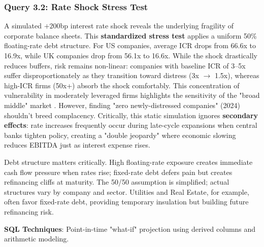 \documentclass[10pt,a4paper]{article}
\begin{document}
    
    
    


\subsubsection{Query 3.2: Rate Shock Stress Test}
A simulated $+200$bp interest rate shock reveals the underlying fragility of corporate balance sheets. This \textbf{standardized stress test} applies a uniform 50\% floating-rate debt structure. For US companies, average ICR drops from 66.6x to 16.9x, while UK companies drop from 56.1x to 16.6x. While the shock drastically reduces buffers, risk remains non-linear: companies with baseline ICR of 3--5x suffer disproportionately as they transition toward distress (3x $\rightarrow$ 1.5x), whereas high-ICR firms (50x+) absorb the shock comfortably. This concentration of vulnerability in moderately leveraged firms highlights the sensitivity of the "broad middle" market \cite{becker2015}. However, finding "zero newly-distressed companies" (2024) shouldn't breed complacency. Critically, this static simulation ignores \textbf{secondary effects}: rate increases frequently occur during late-cycle expansions when central banks tighten policy, creating a "double jeopardy" where economic slowing reduces EBITDA just as interest expense rises.

Debt structure matters critically. High floating-rate exposure creates immediate cash flow pressure when rates rise; fixed-rate debt defers pain but creates refinancing cliffs at maturity. The 50/50 assumption is simplified; actual structures vary by company and sector. Utilities and Real Estate, for example, often favor fixed-rate debt, providing temporary insulation but building future refinancing risk.

\textbf{SQL Techniques}: Point-in-time "what-if" projection using derived columns and arithmetic modeling.
    
    
    
    
    
    
    
    
    
    
    
    
    
    
    
    
    
    

\end{document}
